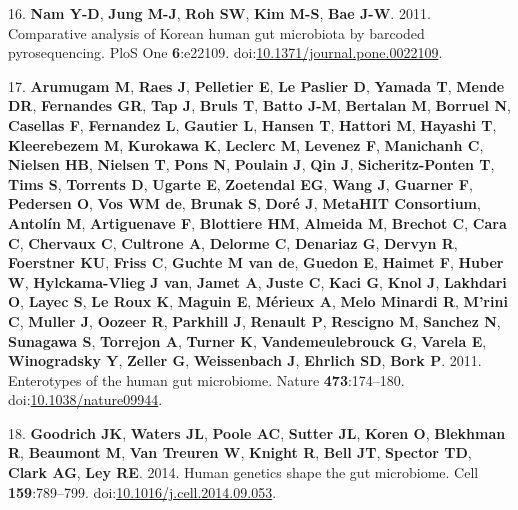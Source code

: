 \documentclass[12pt,]{article}
\begin{document}
\hypertarget{ref-namux5fcomparativeux5f2011}{}
16. \textbf{Nam Y-D}, \textbf{Jung M-J}, \textbf{Roh SW}, \textbf{Kim
M-S}, \textbf{Bae J-W}. 2011. Comparative analysis of Korean human gut
microbiota by barcoded pyrosequencing. PloS One \textbf{6}:e22109.
doi:\href{https://doi.org/10.1371/journal.pone.0022109}{10.1371/journal.pone.0022109}.

\hypertarget{ref-arumugamux5fenterotypesux5f2011}{}
17. \textbf{Arumugam M}, \textbf{Raes J}, \textbf{Pelletier E},
\textbf{Le Paslier D}, \textbf{Yamada T}, \textbf{Mende DR},
\textbf{Fernandes GR}, \textbf{Tap J}, \textbf{Bruls T}, \textbf{Batto
J-M}, \textbf{Bertalan M}, \textbf{Borruel N}, \textbf{Casellas F},
\textbf{Fernandez L}, \textbf{Gautier L}, \textbf{Hansen T},
\textbf{Hattori M}, \textbf{Hayashi T}, \textbf{Kleerebezem M},
\textbf{Kurokawa K}, \textbf{Leclerc M}, \textbf{Levenez F},
\textbf{Manichanh C}, \textbf{Nielsen HB}, \textbf{Nielsen T},
\textbf{Pons N}, \textbf{Poulain J}, \textbf{Qin J},
\textbf{Sicheritz-Ponten T}, \textbf{Tims S}, \textbf{Torrents D},
\textbf{Ugarte E}, \textbf{Zoetendal EG}, \textbf{Wang J},
\textbf{Guarner F}, \textbf{Pedersen O}, \textbf{Vos WM de},
\textbf{Brunak S}, \textbf{Doré J}, \textbf{MetaHIT Consortium},
\textbf{Antolín M}, \textbf{Artiguenave F}, \textbf{Blottiere HM},
\textbf{Almeida M}, \textbf{Brechot C}, \textbf{Cara C},
\textbf{Chervaux C}, \textbf{Cultrone A}, \textbf{Delorme C},
\textbf{Denariaz G}, \textbf{Dervyn R}, \textbf{Foerstner KU},
\textbf{Friss C}, \textbf{Guchte M van de}, \textbf{Guedon E},
\textbf{Haimet F}, \textbf{Huber W}, \textbf{Hylckama-Vlieg J van},
\textbf{Jamet A}, \textbf{Juste C}, \textbf{Kaci G}, \textbf{Knol J},
\textbf{Lakhdari O}, \textbf{Layec S}, \textbf{Le Roux K},
\textbf{Maguin E}, \textbf{Mérieux A}, \textbf{Melo Minardi R},
\textbf{M'rini C}, \textbf{Muller J}, \textbf{Oozeer R},
\textbf{Parkhill J}, \textbf{Renault P}, \textbf{Rescigno M},
\textbf{Sanchez N}, \textbf{Sunagawa S}, \textbf{Torrejon A},
\textbf{Turner K}, \textbf{Vandemeulebrouck G}, \textbf{Varela E},
\textbf{Winogradsky Y}, \textbf{Zeller G}, \textbf{Weissenbach J},
\textbf{Ehrlich SD}, \textbf{Bork P}. 2011. Enterotypes of the human gut
microbiome. Nature \textbf{473}:174--180.
doi:\href{https://doi.org/10.1038/nature09944}{10.1038/nature09944}.

\hypertarget{ref-goodrichux5fhumanux5f2014}{}
18. \textbf{Goodrich JK}, \textbf{Waters JL}, \textbf{Poole AC},
\textbf{Sutter JL}, \textbf{Koren O}, \textbf{Blekhman R},
\textbf{Beaumont M}, \textbf{Van Treuren W}, \textbf{Knight R},
\textbf{Bell JT}, \textbf{Spector TD}, \textbf{Clark AG}, \textbf{Ley
RE}. 2014. Human genetics shape the gut microbiome. Cell
\textbf{159}:789--799.
doi:\href{https://doi.org/10.1016/j.cell.2014.09.053}{10.1016/j.cell.2014.09.053}.
\end{document}
